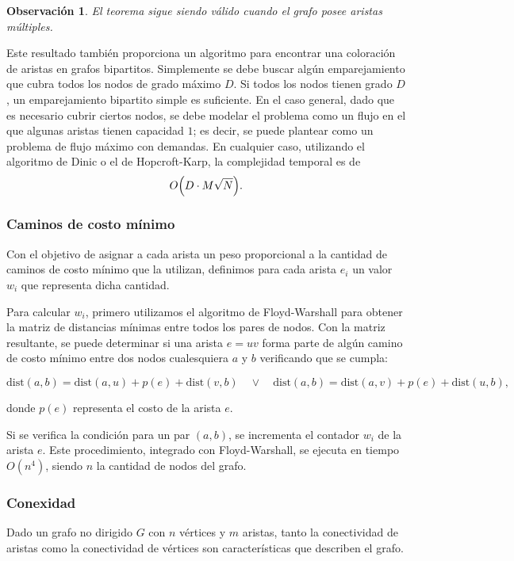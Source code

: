 \documentclass[a4paper]{article}
\newtheorem*{remark}{Observación}
\begin{document}
\begin{remark}
El teorema sigue siendo válido cuando el grafo posee aristas múltiples.
\end{remark}

Este resultado también proporciona un algoritmo para encontrar una coloración de aristas en grafos bipartitos. Simplemente se debe buscar algún emparejamiento que cubra todos los nodos de grado máximo $D$. Si todos los nodos tienen grado $D$, un emparejamiento bipartito simple es suficiente. En el caso general, dado que es necesario cubrir ciertos nodos, se debe modelar el problema como un flujo en el que algunas aristas tienen capacidad $1$; es decir, se puede plantear como un problema de flujo máximo con demandas. En cualquier caso, utilizando el algoritmo de Dinic o el de Hopcroft-Karp, la complejidad temporal es de
\[
O\Bigl(D\cdot M \sqrt{N}\Bigr).
\]

\subsubsection{Caminos de costo mínimo}

Con el objetivo de asignar a cada arista un peso proporcional a la cantidad de caminos de costo mínimo que la utilizan, definimos para cada arista \(e_i\) un valor \(w_i\) que representa dicha cantidad.

Para calcular \(w_i\), primero utilizamos el algoritmo de Floyd-Warshall para obtener la matriz de distancias mínimas entre todos los pares de nodos. Con la matriz resultante, se puede determinar si una arista \(e = uv\) forma parte de algún camino de costo mínimo entre dos nodos cualesquiera \(a\) y \(b\) verificando que se cumpla:

\[
\text{dist}(a, b) = \text{dist}(a, u) + p(e) + \text{dist}(v, b) \quad \lor \quad \text{dist}(a, b) = \text{dist}(a, v) + p(e) + \text{dist}(u, b),
\]

donde \(p(e)\) representa el costo de la arista \(e\).

Si se verifica la condición para un par \((a, b)\), se incrementa el contador \(w_i\) de la arista \(e\). Este procedimiento, integrado con Floyd-Warshall, se ejecuta en tiempo \(O(n^4)\), siendo \(n\) la cantidad de nodos del grafo.


\subsubsection{Conexidad}

Dado un grafo no dirigido \(G\) con \(n\) vértices y \(m\) aristas, tanto la conectividad de aristas como la conectividad de vértices son características que describen el grafo.
\end{document}
